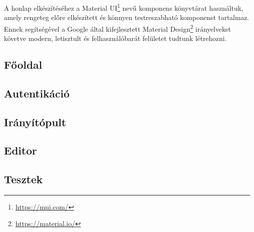 A honlap elkészítéséhez a Material UI\footnote{\url{https://mui.com/}} nevű komponens könyvtárat használtuk, amely rengeteg előre elkészített és könnyen testreszabható komponenst tartalmaz. Ennek segítségével a Google által kifejlesztett Material Design\footnote{\url{https://material.io/}} irányelveket követve modern, letisztult és felhasználóbarát felületet tudtunk létrehozni.

\subsection{Főoldal}


\subsection{Autentikáció}
\subsection{Irányítópult}
\subsection{Editor}
\subsection{Tesztek}